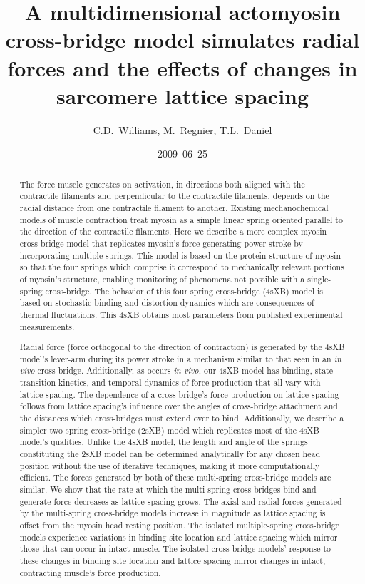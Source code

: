 \documentclass[]{article}
\title{A multidimensional actomyosin cross-bridge model simulates radial forces and the effects of changes in sarcomere lattice spacing}
\author{C.D.\ Williams, M.\ Regnier, T.L.\ Daniel}
\date{2009--06--25}
\begin{document}
\maketitle{}

\begin{abstract} 
The force muscle generates on activation, in directions both aligned with the contractile filaments and perpendicular to the contractile filaments, depends on the radial distance from one contractile filament to another. 
Existing mechanochemical models of muscle contraction treat myosin as a simple linear spring oriented parallel to the direction of the contractile filaments.
Here we describe a more complex myosin cross-bridge model that replicates myosin's force-generating power stroke by incorporating multiple springs. 
This model is based on the protein structure of myosin so that the four springs which comprise it correspond to mechanically relevant portions of myosin's structure, enabling monitoring of phenomena not possible with a single-spring cross-bridge.
The behavior of this four spring cross-bridge (4sXB) model is based on stochastic binding and distortion dynamics which are consequences of thermal fluctuations.  
This 4sXB obtains most parameters from published experimental measurements.

Radial force (force orthogonal to the direction of contraction) is generated by the 4sXB model's lever-arm during its power stroke in a mechanism similar to that seen in an \emph{in vivo} cross-bridge. 
Additionally, as occurs \emph{in vivo}, our 4sXB model has binding, state-transition kinetics, and temporal dynamics of force production that all vary with lattice spacing. 
The dependence of a cross-bridge's force production on lattice spacing follows from lattice spacing's influence over the angles of cross-bridge attachment and the distances which cross-bridges must extend over to bind. 
Additionally, we describe a simpler two spring cross-bridge (2sXB) model which replicates most of the 4sXB model's qualities. 
Unlike the 4sXB model, the length and angle of the springs constituting the 2sXB model can be determined analytically for any chosen head position without the use of iterative techniques, making it more computationally efficient.
The forces generated by both of these multi-spring cross-bridge models are similar. 
We show that the rate at which the multi-spring cross-bridges bind and generate force decreases as lattice spacing grows. 
The axial and radial forces generated by the multi-spring cross-bridge models increase in magnitude as lattice spacing is offset from the myosin head resting position. 
The isolated multiple-spring cross-bridge models experience variations in binding site location and lattice spacing which mirror those that can occur in intact muscle.
The isolated cross-bridge models' response to these changes in binding site location and lattice spacing mirror changes in intact, contracting muscle's force production. 
\end{abstract}
\end{document}
